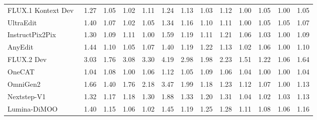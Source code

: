 \documentclass{llmxive}
\begin{document}
\begin{table}[t]
{\begin{tabular}{l|cccccc|cccccc}
            FLUX.1 Kontext Dev~\cite{labs2025flux}
            & 1.27 & 1.05 & 1.02 & 1.11 & 1.24 &\cellcolor[HTML]{C8C8C8}1.13 & 1.03 & 1.12 & 1.00 & 1.05 & 1.00
            & \cellcolor[HTML]{C8C8C8}1.05 \\

            UltraEdit~\cite{zhao2024ultraedit}
            & 1.40 & 1.07 & 1.02 & 1.05 & 1.34 &  \cellcolor[HTML]{C8C8C8}1.16 & 1.10 & 1.11 & 1.00 & 1.05 & 1.05
            & \cellcolor[HTML]{C8C8C8}1.07  \\

            InstructPix2Pix~\cite{brooks2023instructpix2pix}
            & 1.30 & 1.09 & 1.11 & 1.00 & 1.59 & \cellcolor[HTML]{C8C8C8}1.19 & 1.11 & 1.21 & 1.06 & 1.03 & 1.00
            & \cellcolor[HTML]{C8C8C8}1.09 \\

            AnyEdit~\cite{yu2025anyedit}
            & 1.44 & 1.10 & 1.05 & 1.07 & 1.40 &  \cellcolor[HTML]{C8C8C8}1.19 & 1.22 & 1.13 & 1.02 & 1.06 & 1.00
            & \cellcolor[HTML]{C8C8C8}1.10 \\

            

            FLUX.2 Dev~\cite{flux-2-2025}
            & 3.03 & 1.76 & 3.08 & 3.30 & 4.19 &  \cellcolor[HTML]{C8C8C8} 2.98  & 1.98 & 2.23 & 1.51 & 1.22 & 1.06
            & \cellcolor[HTML]{C8C8C8} 1.64  \\

            \midrule

            OneCAT~\cite{li2025onecat}
            & 1.04 & 1.08 & 1.00 & 1.06 & 1.12 & \cellcolor[HTML]{C8C8C8}1.05 & 1.09 & 1.06 & 1.04 & 1.00 & 1.00
            & \cellcolor[HTML]{C8C8C8}1.04 \\

            OmniGen2~\cite{wu2025omnigen2}
            & 1.66 & 1.40 & 1.76 & 2.18 & 3.47 &\cellcolor[HTML]{C8C8C8}1.99  & 1.18 & 1.23 & 1.12 & 1.07 & 1.00
            & \cellcolor[HTML]{C8C8C8}1.13  \\

            Nextstep-V1~\cite{han2025nextstep}
            & 1.32 & 1.17 & 1.18 & 1.30 & 1.88 & \cellcolor[HTML]{C8C8C8}1.33 & 1.20 & 1.31 & 1.04 & 1.02 & 1.03
            & \cellcolor[HTML]{C8C8C8}1.13 \\

            Lumina-DiMOO~\cite{xin2025lumina}
            & 1.40 & 1.15 & 1.06 & 1.02 & 1.45 & \cellcolor[HTML]{C8C8C8}1.19 & 1.25 & 1.28 & 1.11 & 1.08 & 1.06
            & \cellcolor[HTML]{C8C8C8}1.16 \\


\end{tabular}}
\end{table}
\end{document}
